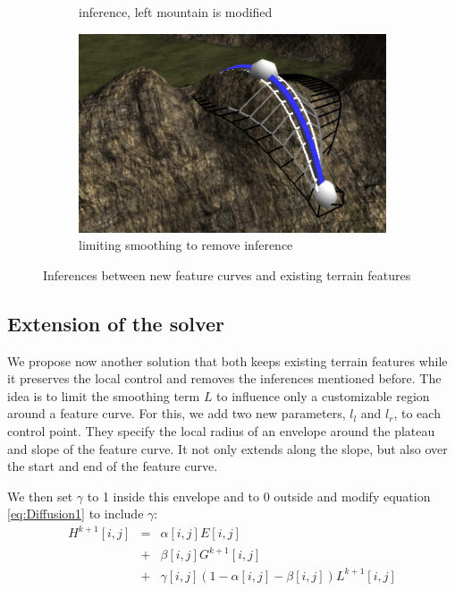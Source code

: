 \documentclass[journal, letterpaper]{IEEEtran}
\begin{document}
\begin{figure}
\begin{subfigure}[b]{0.3\textwidth}
		\caption{inference, left mountain is modified}
		\label{fig:diffusionError2}
	\end{subfigure}
	\begin{subfigure}[b]{0.3\textwidth}
		\includegraphics[width=\textwidth]{images/diffusionErrorSolved}
		\caption{limiting smoothing to remove inference}
		\label{fig:diffusionError3}
	\end{subfigure}
	\caption{Inferences between new feature curves and existing terrain features}\label{fig:diffusion3}
\end{figure}

\subsection{Extension of the solver}
We propose now another solution that both keeps existing terrain features while it preserves the local control and removes the inferences mentioned before.
The idea is to limit the smoothing term $L$ to influence only a customizable region around a feature curve.
For this, we add two new parameters, $l_l$ and $l_r$, to each control point. They specify the local radius of an envelope around the plateau and slope of the feature curve.
It not only extends along the slope, but also over the start and end of the feature curve. 

We then set $\gamma$ to 1 inside this envelope and to 0 outside and modify equation \ref{eq:Diffusion1} to include $\gamma$:
\begin{equation}
\begin{array}{rcl}
	H^{k+1}[i,j] &=& \alpha[i,j] E[i,j]  \\
	             &+& \beta[i,j] G^{k+1}[i,j]  \\
							 &+& \gamma[i,j] (1-\alpha[i,j]-\beta[i,j]) L^{k+1}[i,j]
\end{array}
\label{eq:Diffusion1_mod}
\end{equation}
\end{document}
